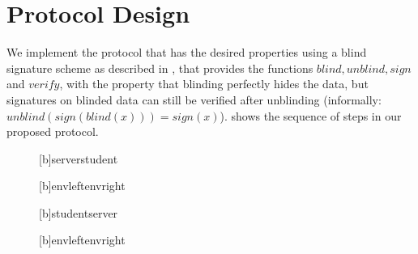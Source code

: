 \section{Protocol Design}
    \label{section:document-submission-system:design-implementation}
We implement the protocol that has the desired properties using a blind
signature scheme as described in \cite{chaum_blind_1982}, that provides the functions $blind, unblind, sign$ and
$verify$, with the property that blinding perfectly hides the data, but
signatures on blinded data can still be verified after unblinding
(informally: $unblind(sign(blind(x))) = sign(x)$).
%
 shows the sequence of steps in our proposed protocol.
%
\begin{figure}[h!]
	\renewcommand{\msckeyword}{}
	\scriptsize
	\begin{msc}{}
		\setlength{\labeldist}{3ex}
		\setlength{\labeldist}{1ex}

		\nextlevel[3]

		[b]{server}{student} 
		\nextlevel[1.7]

		[b]{envleft}{envright}
		\nextlevel[1]

		\nextlevel[4.5]

		[b]{student}{server} 
		\nextlevel[1.5]

		[b]{envleft}{envright}
		\nextlevel[1]

		\setlength{\inlineoverlap}{22mm}
				\nextlevel[2.5]


\end{msc}
\end{figure}
